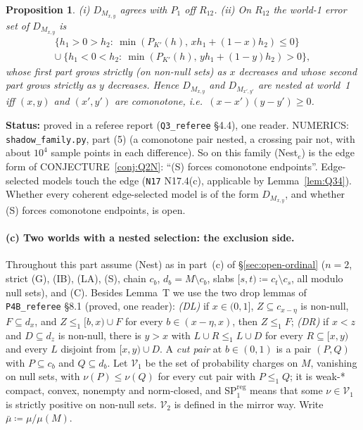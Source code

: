 \documentclass[11pt]{article}
\newtheorem{proposition}[theorem]{Proposition}
\theoremstyle{definition}
\theoremstyle{remark}
\newcommand{\src}[1]{\texttt{#1}}
\newcommand{\status}[1]{\par\smallskip\noindent\textbf{Status:} #1\par\smallskip}
\begin{document}
\begin{proposition}\label{prop:comonotone}
(i) $D_{M_{x,y}}$ agrees with $P_1$ off $R_{12}$. (ii) On $R_{12}$ the world-1 error set of $D_{M_{x,y}}$ is
\begin{multline*}
\{h_1>0>h_2:\ \min(P_{K'}(h),\,xh_1+(1-x)h_2)\le0\}\\
\cup\ \{h_1<0<h_2:\ \min(P_{K'}(h),\,yh_1+(1-y)h_2)>0\},
\end{multline*}
whose first part grows strictly (on non-null sets) as $x$ decreases and whose second part grows strictly as $y$ decreases. Hence $D_{M_{x,y}}$ and $D_{M_{x',y'}}$ are nested at world~1 iff $(x,y)$ and $(x',y')$ are comonotone, i.e.\ $(x-x')(y-y')\ge0$.
\end{proposition}
\status{proved in a referee report (\src{Q3\_referee} \S4.4), one reader. NUMERICS: \src{shadow\_family.py}, part (5) (a comonotone pair nested, a crossing pair not, with about $10^4$ sample points in each difference). So on this family (Nest$_e$) is the edge form of CONJECTURE~\ref{conj:Q2N}: ``(S) forces comonotone endpoints''. Edge-selected models touch the edge (\src{N17} N17.4(c), applicable by Lemma~\ref{lem:Q34}). Whether every coherent edge-selected model is of the form $D_{M_{x,y}}$, and whether (S) forces comonotone endpoints, is open.}

\paragraph{(c) Two worlds with a nested selection: the exclusion side.} Throughout this part assume (Nest) as in part~(c) of \S\ref{sec:open-ordinal} ($n=2$, strict (G), (IB), (LA), (S), chain $c_b$, $d_b=M\setminus c_b$, slabs $[s,t)\coloneqq c_t\setminus c_s$, all modulo null sets), and (C). Besides Lemma~T we use the two drop lemmas of \src{P4B\_referee} \S8.1 (proved, one reader): \emph{(DL)} if $x\in(0,1]$, $Z\subseteq c_{x-\eta}$ is non-null, $F\subseteq d_x$, and $Z\le_1[b,x)\cup F$ for every $b\in(x-\eta,x)$, then $Z\le_1F$; \emph{(DR)} if $x<z$ and $D\subseteq d_z$ is non-null, there is $y>x$ with $L\cup R\le_1L\cup D$ for every $R\subseteq[x,y)$ and every $L$ disjoint from $[x,y)\cup D$. A \emph{cut pair} at $b\in(0,1)$ is a pair $(P,Q)$ with $P\subseteq c_b$ and $Q\subseteq d_b$. Let $\mathcal V_1$ be the set of probability charges on $M$, vanishing on null sets, with $\nu(P)\le\nu(Q)$ for every cut pair with $P\le_1Q$; it is weak-* compact, convex, nonempty and norm-closed, and SP$^{\mathrm{reg}}_1$ means that some $\nu\in\mathcal V_1$ is strictly positive on non-null sets. $\mathcal V_2$ is defined in the mirror way. Write $\bar\mu\coloneqq\mu/\mu(M)$.
\end{document}
